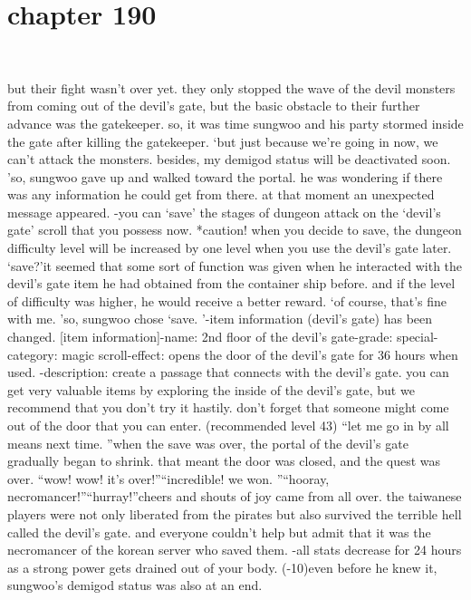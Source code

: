 \section{chapter 190}

                             




but their fight wasn’t over yet.
 they only stopped the wave of the devil monsters from coming out of the devil’s gate, but the basic obstacle to their further advance was the gatekeeper.
so, it was time sungwoo and his party stormed inside the gate after killing the gatekeeper.
‘but just because we’re going in now, we can’t attack the monsters.
 besides, my demigod status will be deactivated soon.
’so, sungwoo gave up and walked toward the portal.
 he was wondering if there was any information he could get from there.
at that moment an unexpected message appeared.
-you can ‘save’ the stages of dungeon attack on the ‘devil’s gate’ scroll that you possess now.
*caution! when you decide to save, the dungeon difficulty level will be increased by one level when you use the devil’s gate later.
‘save?’it seemed that some sort of function was given when he interacted with the devil’s gate item he had obtained from the container ship before.
and if the level of difficulty was higher, he would receive a better reward.
‘of course, that’s fine with me.
’so, sungwoo chose ‘save.
’-item information (devil’s gate) has been changed.
[item information]-name: 2nd floor of the devil’s gate-grade: special-category: magic scroll-effect: opens the door of the devil’s gate for 36 hours when used.
-description: create a passage that connects with the devil’s gate.
 you can get very valuable items by exploring the inside of the devil’s gate, but we recommend that you don’t try it hastily.
 don’t forget that someone might come out of the door that you can enter.
 (recommended level 43)
“let me go in by all means next time.
”when the save was over, the portal of the devil’s gate gradually began to shrink.
that meant the door was closed, and the quest was over.
“wow! wow! it’s over!”“incredible! we won.
”“hooray, necromancer!”“hurray!”cheers and shouts of joy came from all over.
 the taiwanese players were not only liberated from the pirates but also survived the terrible hell called the devil’s gate.
and everyone couldn’t help but admit that it was the necromancer of the korean server who saved them.
-all stats decrease for 24 hours as a strong power gets drained out of your body.
 (-10)even before he knew it, sungwoo’s demigod status was also at an end.
